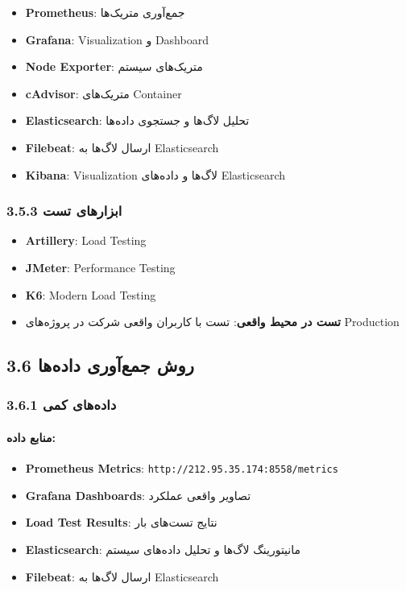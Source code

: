 \documentclass[
]{article}
\providecommand{\tightlist}{%
  \setlength{\itemsep}{0pt}\setlength{\parskip}{0pt}}
\begin{document}
\begin{itemize}
\tightlist
\item
  \textbf{Prometheus}: جمع‌آوری متریک‌ها
\item
  \textbf{Grafana}: Visualization و Dashboard
\item
  \textbf{Node Exporter}: متریک‌های سیستم
\item
  \textbf{cAdvisor}: متریک‌های Container
\item
  \textbf{Elasticsearch}: تحلیل لاگ‌ها و جستجوی داده‌ها
\item
  \textbf{Filebeat}: ارسال لاگ‌ها به Elasticsearch
\item
  \textbf{Kibana}: Visualization لاگ‌ها و داده‌های Elasticsearch
\end{itemize}

\subsubsection{3.5.3 ابزارهای
تست}\label{ux627ux628ux632ux627ux631ux647ux627ux6cc-ux62aux633ux62a}

\begin{itemize}
\tightlist
\item
  \textbf{Artillery}: Load Testing
\item
  \textbf{JMeter}: Performance Testing
\item
  \textbf{K6}: Modern Load Testing
\item
  \textbf{تست در محیط واقعی}: تست با کاربران واقعی شرکت در پروژه‌های
  Production
\end{itemize}

\subsection{3.6 روش جمع‌آوری
داده‌ها}\label{ux631ux648ux634-ux62cux645ux639ux622ux648ux631ux6cc-ux62fux627ux62fux647ux647ux627}

\subsubsection{3.6.1 داده‌های
کمی}\label{ux62fux627ux62fux647ux647ux627ux6cc-ux6a9ux645ux6cc}

\paragraph{منابع
داده:}\label{ux645ux646ux627ux628ux639-ux62fux627ux62fux647}

\begin{itemize}
\tightlist
\item
  \textbf{Prometheus Metrics}:
  \texttt{http://212.95.35.174:8558/metrics}
\item
  \textbf{Grafana Dashboards}: تصاویر واقعی عملکرد
\item
  \textbf{Load Test Results}: نتایج تست‌های بار
\item
  \textbf{Elasticsearch}: مانیتورینگ لاگ‌ها و تحلیل داده‌های سیستم
\item
  \textbf{Filebeat}: ارسال لاگ‌ها به Elasticsearch
\end{itemize}
\end{document}
